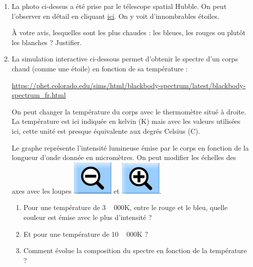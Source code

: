 \documentclass[12pt,a4paper]{article}
\begin{document}
\begin{enumerate}
\item \anarai{}
\label{quest:hyp}

La photo ci-dessus a été prise par le télescope spatial Hubble.
On peut l'observer en détail en cliquant \href{https://www.nasa.gov/feature/goddard/2021/hubble-uncovers-concentration-of-small-black-holes}{ici}.
On y voit d'innombrables étoiles.

À votre avis, lesquelles sont les plus chaudes : les bleues, les rouges ou plutôt les blanches ?
Justifier.

\item \app{} \anarai{}

La simulation interactive ci-dessous permet d'obtenir le spectre d'un corps chaud (comme une étoile) en fonction de sa température :

\href{https://phet.colorado.edu/sims/html/blackbody-spectrum/latest/blackbody-spectrum\_fr.html}{https://phet.colorado.edu/sims/html/blackbody-spectrum/latest/blackbody-spectrum\_fr.html}

On peut changer la température du corps avec le thermomètre situé à droite. 
La température est ici indiquée en kelvin (K) mais avec les valeurs utilisées ici, cette unité est presque équivalente aux degrés Celsius (\degree C).

Le graphe représente l'intensité lumineuse émise par le corps en fonction de la longueur d'onde donnée en micromètres.
On peut modifier les échelles des axes avec les loupes \includegraphics[height=0.75\baselineskip]{images/zoom_out.png} et \includegraphics[height=0.75\baselineskip]{images/zoom_in.png}.

\begin{enumerate}
\item Pour une température de \unit{3\,000}{K}, entre le rouge et le bleu, quelle couleur est émise avec le plus d'intensité ?

\item Et pour une température de \unit{10\,000}{K} ?

\item Comment évolue la composition du spectre en fonction de la température ?
\end{enumerate}
\end{enumerate}
\end{document}
